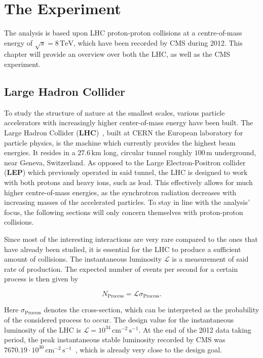 \chapter{The Experiment}
\label{cha:experiment}

The analysis is based upon LHC proton-proton collisions at a centre-of-mass energy of $\sqrt{s} = 8\,\text{TeV}$, which have been recorded by CMS during 2012. This chapter will provide an overview over both the LHC, as well as the CMS experiment.


\section{Large Hadron Collider}
\label{sec:lhc} 

To study the structure of nature at the smallest scales, various particle accelerators with increasingly higher center-of-mass energy have been built. The Large Hadron Collider (\textbf{LHC})~\cite{lhcjinst}, built at CERN the European laboratory for particle physics, is the machine which currently provides the highest beam energies. It resides in a $27.6\,\text{km}$ long, circular tunnel roughly $100\,\text{m}$ underground, near Geneva, Switzerland. As opposed to the Large Electron-Positron collider (\textbf{LEP}) which previously operated in said tunnel, the LHC is designed to work with both protons and heavy ions, such as lead. This effectively allows for much higher centre-of-mass energies, as the synchrotron radiation decreases with increasing masses of the accelerated particles. To stay in line with the analysis' focus, the following sections will only concern themselves with proton-proton collisions.

Since most of the interesting interactions are very rare compared to the ones that have already been studied, it is essential for the LHC to produce a sufficient amount of collisions. The instantaneous luminosity $\mathcal{L}$ is a measurement of said rate of production. The expected number of events per second for a certain process is then given by

\begin{equation}
  \label{eq:instlumi}
  N_{\text{Process}} = \mathcal{L} \sigma_{\text{Process}}.
\end{equation}

\noindent Here $\sigma_{\text{Process}}$ denotes the cross-section, which can be interpreted as the probability of the considered process to occur. The design value for the instantaneous luminosity of the LHC is $\mathcal{L} = 10^{34}\,\text{cm}^{-2}\,\text{s}^{-1}$. At the end of the 2012 data taking period, the peak instantaneous stable luminosity recorded by CMS was $7670.19 \cdot 10^{30}\,\text{cm}^{-2}\,\text{s}^{-1}$~\cite{cmslumi}, which is already very close to the design goal.

